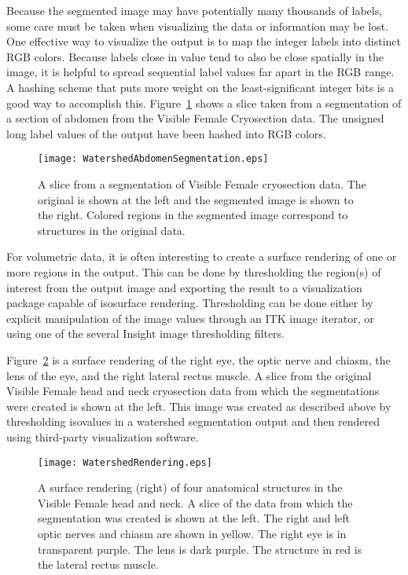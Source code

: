 Because the segmented image may have potentially many thousands of labels, some
care must be taken when visualizing the data or information may be lost.  One
effective way to visualize the output is to map the integer labels into
distinct RGB colors.  Because labels close in value tend to also be close
spatially in the image, it is helpful to spread sequential label values far
apart in the RGB range.  A hashing scheme that puts more weight on the
least-significant integer bits is a good way to accomplish this.
Figure~\ref{fig:colorVisWatersheds} shows a slice taken from a segmentation of
a section of abdomen from the Visible Female Cryosection data.  The unsigned
long label values of the output have been hashed into RGB colors.

\begin{figure}
\centering
\texttt{[image: WatershedAbdomenSegmentation.eps]}
\caption{A slice from a segmentation of Visible Female cryosection data.
The original is shown at the left and the segmented image is shown to the
right. Colored regions in the segmented image correspond to structures in the
original data. }
\protect\label{fig:colorVisWatersheds}
\end{figure}

For volumetric data, it is often interesting to create a surface rendering of
one or more regions in the output.  This can be done by thresholding the
region(s) of interest from the output image and exporting the result to a
visualization package capable of isosurface rendering.  Thresholding can be
done either by explicit manipulation of the image values through an ITK image
iterator, or using one of the several Insight image thresholding filters.

Figure~\ref{fig:surfaceRenderingWatersheds} is a surface rendering of the right
eye, the optic nerve and chiasm, the lens of the eye, and the right lateral
rectus muscle.  A slice from the original Visible Female head and neck
cryosection data from which the segmentations were created is shown at the
left.  This image was created as described above by thresholding isovalues in a
watershed segmentation output and then rendered using third-party visualization
software.

\begin{figure}
\centering
\texttt{[image: WatershedRendering.eps]}
\caption{A surface rendering (right) of four anatomical structures in the Visible
Female head and neck. A slice of the data from which the segmentation was
created is shown at the left.  The right and left optic nerves and chiasm are
shown in yellow.  The right eye is in transparent purple.  The lens is dark
purple.  The structure in red is the lateral rectus muscle.}
\protect\label{fig:surfaceRenderingWatersheds}
\end{figure}

